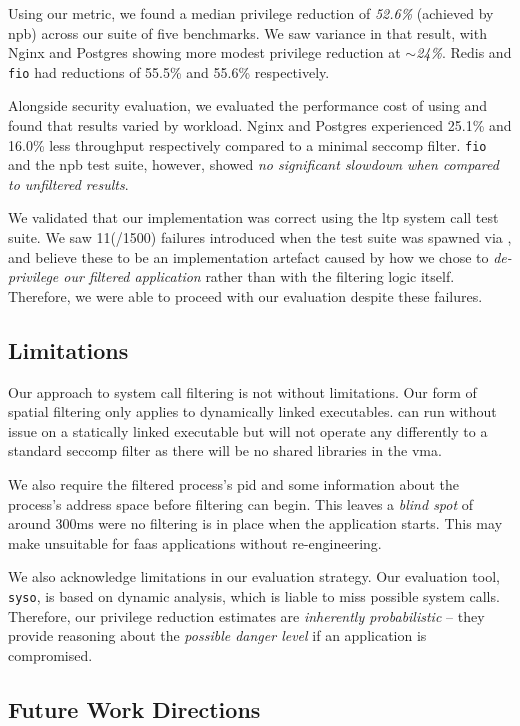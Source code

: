 Using our metric, we found a median privilege reduction of \textit{52.6\%}
(achieved by \ac{npb}) across our suite of five benchmarks. We saw variance in that
result, with Nginx and Postgres showing more modest privilege reduction at
$\sim$\textit{24\%}. Redis and \texttt{fio} had reductions of 55.5\% and 55.6\%
respectively.

Alongside security evaluation, we evaluated the performance cost of using \af
and found that results varied by workload. Nginx and Postgres experienced 25.1\% and 16.0\%
less throughput respectively compared to a minimal seccomp filter. \texttt{fio}
and the \ac{npb} test suite, however, showed \textit{no significant slowdown
when compared to unfiltered results}. 

We validated that our implementation was correct using the \ac{ltp} system call
test suite. We saw 11(/1500) failures introduced when the test suite was spawned via
\af, and believe these to be an implementation artefact caused by how we chose
to \textit{de-privilege our filtered application} rather than with the filtering
logic itself. Therefore, we were able to proceed with our evaluation despite
these failures. 

\subsection{Limitations}

Our approach to system call filtering is not without limitations. Our form of 
spatial filtering only applies to dynamically linked executables.
\af can run without issue on a statically linked executable but will not operate
any differently to a standard seccomp filter as there will be no shared
libraries in the \ac{vma}.

We also require the filtered process's \ac{pid} and some information about the
process's address space before filtering can begin. This leaves a \textit{blind
spot} of around 300ms were no filtering is in place when the application starts.
This may make \af unsuitable for \ac{faas} applications without re-engineering.

We also acknowledge limitations in our evaluation strategy. Our evaluation tool,
\texttt{syso}, is based on dynamic analysis, which is liable to miss possible
system calls. Therefore, our privilege reduction estimates are
\textit{inherently probabilistic} -- they provide reasoning about the
\textit{possible danger level} if an application is compromised.

\subsection{Future Work Directions}

